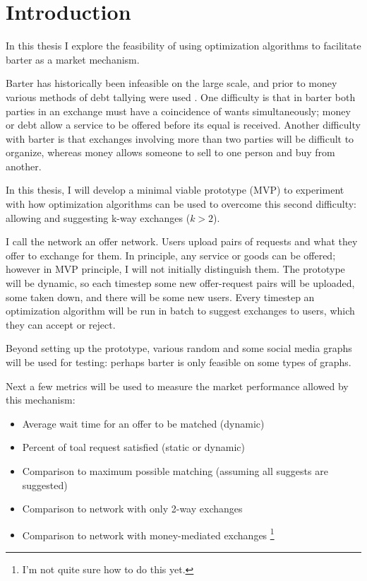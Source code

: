 \documentclass[main.tex]{subfiles}
\begin{document}
\section{Introduction}
In this thesis I explore the feasibility of using optimization algorithms to facilitate barter as a market mechanism.

Barter has historically been infeasible on the large scale, and prior to money various methods of debt tallying were used \cite{Gra1}. One difficulty is that in barter both parties in an exchange must have a coincidence of wants simultaneously; money or debt allow a service to be offered before its equal is received. Another difficulty with barter is that exchanges involving more than two parties will be difficult to organize, whereas money allows someone to sell to one person and buy from another.

In this thesis, I will develop a minimal viable prototype (MVP) to experiment with how optimization algorithms can be used to overcome this second difficulty: allowing and suggesting k-way exchanges ($k>2$).

I call the network an offer network. Users upload pairs of requests and what they offer to exchange for them. In principle, any service or goods can be offered; however in MVP principle, I will not initially distinguish them. The prototype will be dynamic, so each timestep some new offer-request pairs will be uploaded, some taken down, and there will be some new users. Every timestep an optimization algorithm will be run in batch to suggest exchanges to users, which they can accept or reject.

Beyond setting up the prototype, various random and some social media graphs will be used for testing: perhaps barter is only feasible on some types of graphs.

Next a few metrics will be used to measure the market performance allowed by this mechanism:
\begin{itemize}
  \item Average wait time for an offer to be matched (dynamic)
  \item Percent of toal request satisfied (static or dynamic)
  \item Comparison to maximum possible matching (assuming all suggests are suggested)
  \item Comparison to network with only 2-way exchanges
  \item Comparison to network with money-mediated exchanges \footnote{I'm not quite sure how to do this yet.}
\end{itemize}
\end{document}
